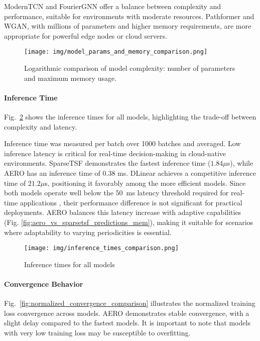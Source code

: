 \documentclass{ieeetmlcn}
\begin{document}
ModernTCN and FourierGNN offer a balance between complexity and performance, suitable for environments with moderate resources. Pathformer and WGAN, with millions of parameters and higher memory requirements, are more appropriate for powerful edge nodes or cloud servers.


\begin{figure}\centering
[t]
\centering
\centering\texttt{[image: img/model\_params\_and\_memory\_comparison.png]}
\caption{Logarithmic comparison of model complexity: number of parameters and maximum memory usage.}
\label{fig:model_params_and_memory_comparison}
\end{figure}

\paragraph*{Inference Time}

Fig.~\ref{fig:inference_times} shows the inference times for all models, highlighting the trade-off between complexity and latency.

Inference time was measured per batch over 1000 batches and averaged. Low inference latency is critical for real-time decision-making in cloud-native environments. SparseTSF demonstrates the fastest inference time ($1.84 \mu$s), while AERO has an inference time of $0.38$ ms. {\color{blue} DLinear achieves a competitive inference time of $21.2 \mu$s, positioning it favorably among the more efficient models.} Since both models operate well below the \SI{50}{\milli\second} latency threshold required for real-time applications \cite{50mslatency}, their performance difference is not significant for practical deployments. AERO balances this latency increase with adaptive capabilities (Fig. \ref{fig:aero_vs_sparsetsf_predictions_mem}), making it suitable for scenarios where adaptability to varying periodicities is essential.

\begin{figure}\centering
[t]
\centering
\centering\texttt{[image: img/inference\_times\_comparison.png]}
\caption{Inference times for all models}
\label{fig:inference_times}
\end{figure}

\paragraph*{Convergence Behavior}

Fig.~\ref{fig:normalized_convergence_comparison} illustrates the normalized training loss convergence across models. AERO demonstrates stable convergence, with a slight delay compared to the fastest models. It is important to note that models with very low training loss may be susceptible to overfitting.
\end{document}
